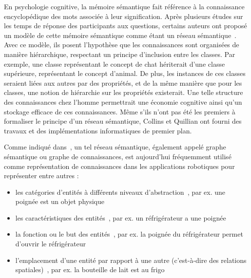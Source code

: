 En psychologie cognitive, la mémoire sémantique fait référence à la connaissance encyclopédique des mots associée à leur signification. Après plusieurs études sur les temps de réponse des participants aux questions, certains auteurs ont proposé un modèle de cette mémoire sémantique comme étant un réseau sémantique~\cite{collins_1969_retrieval, collins_1970_does}. Avec ce modèle, ils posent l'hypothèse que les connaissances sont organisées de manière hiérarchique, respectant un principe d'inclusion entre les classes. Par exemple, une classe représentant le concept de chat hériterait d'une classe supérieure, représentant le concept d'animal. De plus, les instances de ces classes seraient liées aux autres par des propriétés, et de la même manière que pour les classes, une notion de hiérarchie sur les propriétés existerait. Une telle structure des connaissances chez l'homme permettrait une économie cognitive ainsi qu'un stockage efficace de ces connaissances. Même s'ils n'ont pas été les premiers à formaliser le principe d'un réseau sémantique, Collins et Quillian ont fourni des travaux et des implémentations informatiques de premier plan.

Comme indiqué dans~\cite{prasad_2020_knowledge}, un tel réseau sémantique, également appelé graphe sémantique ou graphe de connaissances, est aujourd'hui fréquemment utilisé comme représentation de connaissances dans les applications robotiques pour représenter entre autres :

\begin{itemize}
   \item les catégories d'entités à différents niveaux d'abstraction~\cite{balint_2018_variations}, par ex. une poignée est un objet physique
   \item les caractéristiques des entités~\cite{tenorth_2017_representations}, par ex. un réfrigérateur a une poignée
   \item la fonction ou le but des entités~\cite{paulius_2019_functional}, par ex. la poignée du réfrigérateur permet d'ouvrir le réfrigérateur
   \item l'emplacement d'une entité par rapport à une autre (c'est-à-dire des relations spatiales)~\cite{singh_2020_fuzzy}, par ex. la bouteille de lait est au frigo
\end{itemize}

